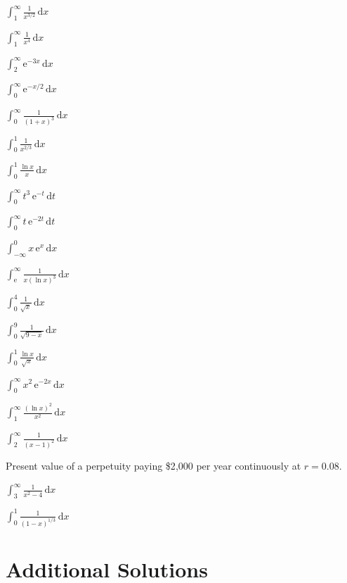 \begin{problems}
  \item $\displaystyle\int_{1}^{\infty} \frac{1}{x^{3/2}}\,\mathrm{d}x$
  \item $\displaystyle\int_{1}^{\infty} \frac{1}{x^{4}}\,\mathrm{d}x$
  \item $\displaystyle\int_{2}^{\infty} \mathrm{e}^{-3x}\,\mathrm{d}x$
  \item $\displaystyle\int_{0}^{\infty} \mathrm{e}^{-x/2}\,\mathrm{d}x$
  \item $\displaystyle\int_{0}^{\infty} \frac{1}{(1+x)^{3}}\,\mathrm{d}x$
  \item $\displaystyle\int_{0}^{1} \frac{1}{x^{2/3}}\,\mathrm{d}x$
  \item $\displaystyle\int_{0}^{1} \frac{\ln x}{x}\,\mathrm{d}x$
  \item $\displaystyle\int_{0}^{\infty} t^{3}\,\mathrm{e}^{-t}\,\mathrm{d}t$
  \item $\displaystyle\int_{0}^{\infty} t\,\mathrm{e}^{-2t}\,\mathrm{d}t$
  \item $\displaystyle\int_{-\infty}^{0} x\,\mathrm{e}^{x}\,\mathrm{d}x$
  \item $\displaystyle\int_{\mathrm{e}}^{\infty} \frac{1}{x(\ln x)^{3}}\,\mathrm{d}x$
  \item $\displaystyle\int_{0}^{4} \frac{1}{\sqrt{x}}\,\mathrm{d}x$
  \item $\displaystyle\int_{0}^{9} \frac{1}{\sqrt{9-x}}\,\mathrm{d}x$
  \item $\displaystyle\int_{0}^{1} \frac{\ln x}{\sqrt{x}}\,\mathrm{d}x$
  \item $\displaystyle\int_{0}^{\infty} x^{2}\,\mathrm{e}^{-2x}\,\mathrm{d}x$
  \item $\displaystyle\int_{1}^{\infty} \frac{(\ln x)^{2}}{x^{2}}\,\mathrm{d}x$
  \item $\displaystyle\int_{2}^{\infty} \frac{1}{(x-1)^{2}}\,\mathrm{d}x$
  \item Present value of a perpetuity paying \$2{,}000 per year
        continuously at $r=0.08$.
  \item $\displaystyle\int_{3}^{\infty} \frac{1}{x^{2}-4}\,\mathrm{d}x$
  \item $\displaystyle\int_{0}^{1} \frac{1}{(1-x)^{1/3}}\,\mathrm{d}x$
\end{problems}

\section{Additional Solutions}

